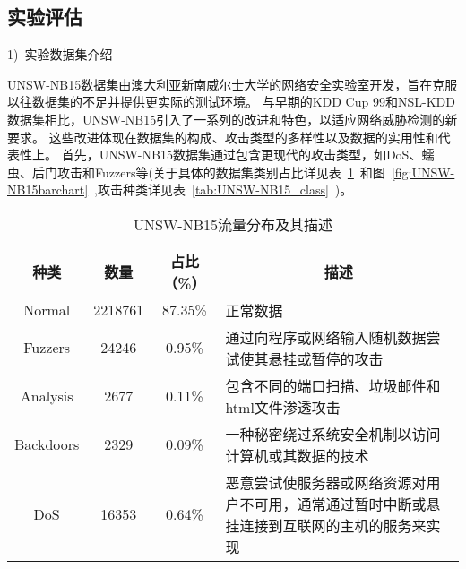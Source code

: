 \subsection{实验评估}
1)~实验数据集介绍\par
UNSW-NB15数据集\cite{moustafa2015comprehensive}由澳大利亚新南威尔士大学的网络安全实验室开发，旨在克服以往数据集的不足并提供更实际的测试环境。
与早期的KDD Cup 99和NSL-KDD数据集相比，UNSW-NB15引入了一系列的改进和特色，以适应网络威胁检测的新要求。
这些改进体现在数据集的构成、攻击类型的多样性以及数据的实用性和代表性上。
首先，UNSW-NB15数据集通过包含更现代的攻击类型，如DoS、蠕虫、后门攻击和Fuzzers等(关于具体的数据集类别占比详见表~\ref{tab:UNSW-NB15_distribution}~和图~\ref{fig:UNSW-NB15barchart}~,攻击种类详见表~\ref{tab:UNSW-NB15_class}~)。
\begin{table}[h]
	\caption{UNSW-NB15流量分布及其描述}
	\label{tab:UNSW-NB15_distribution}
	\begin{tabularx}{\textwidth}{@{}cccX@{}}
		\toprule
		\multicolumn{1}{c}{\textbf{种类}} & \multicolumn{1}{c}{\textbf{数量}} & \multicolumn{1}{c}{\textbf{占比（\%）}} & \multicolumn{1}{c}{\textbf{描述}}                                                                \\
		\midrule
		Normal                            & 2218761                           & 87.35\%                                 & 正常数据                                                                                         \\

		Fuzzers                           & 24246                             & 0.95\%                                  & 通过向程序或网络输入随机数据尝试使其悬挂或暂停的攻击                                             \\

		Analysis                          & 2677                              & 0.11\%                                  & 包含不同的端口扫描、垃圾邮件和html文件渗透攻击                                                   \\

		Backdoors                         & 2329                              & 0.09\%                                  & 一种秘密绕过系统安全机制以访问计算机或其数据的技术                                               \\

		DoS                               & 16353                             & 0.64\%                                  & 恶意尝试使服务器或网络资源对用户不可用，通常通过暂时中断或悬挂连接到互联网的主机的服务来实现     \\


\end{tabularx}
\end{table}
